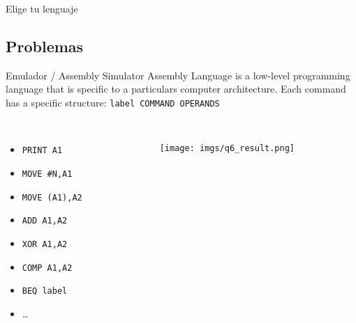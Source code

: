 \begin{frame}{Elige tu lenguaje}
\end{frame}

\subsection{Problemas}
\begin{frame}{Emulador / Assembly Simulator}
    \small
    Assembly Language is a low-level programming language that is specific to a particulars computer
    architecture. Each command has a specific structure: \texttt{label COMMAND OPERANDS} \\~
    
    \begin{columns}
    \begin{column}{0.50\textwidth}
        \begin{itemize}
            \item \texttt{PRINT A1}
            \item \texttt{MOVE \#N,A1}
            \item \texttt{MOVE (A1),A2}
            \item \texttt{ADD A1,A2}
            \item \texttt{XOR A1,A2}
            \item \texttt{COMP A1,A2}
            \item \texttt{BEQ label}
            \item \ldots
        \end{itemize}
    \end{column}
    \begin{column}{0.50\textwidth}
        \texttt{[image: imgs/q6\_result.png]}
    \end{column}
    \end{columns}
\end{frame}

